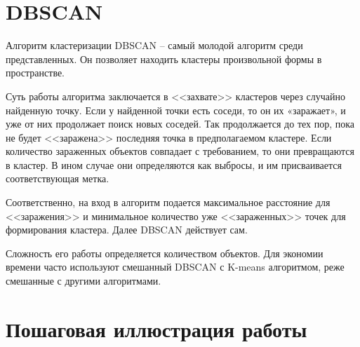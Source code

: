 

%

\section*{DBSCAN}

Алгоритм кластеризации DBSCAN – самый молодой алгоритм среди представленных. Он позволяет находить кластеры произвольной формы в пространстве.

Суть работы алгоритма заключается в <<захвате>> кластеров через случайно найденную точку. Если у найденной точки есть соседи, то он их «заражает», и уже от них продолжает поиск новых соседей. Так продолжается до тех пор, пока не будет <<заражена>> последняя точка в предполагаемом кластере. Если количество зараженных объектов совпадает с требованием, то они превращаются в кластер. В ином случае они определяются как выбросы, и им присваивается соответствующая метка.

Соответственно, на вход в алгоритм подается максимальное расстояние для <<заражения>> и минимальное количество уже <<зараженных>> точек для формирования кластера. Далее DBSCAN действует сам.

Сложность его работы определяется количеством  объектов. Для экономии времени часто используют смешанный DBSCAN с K-means алгоритмом, реже смешанные с другими алгоритмами.

\section*{Пошаговая иллюстрация работы}

